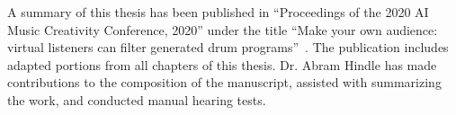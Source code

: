 \documentclass[\main/thesis.tex]{subfiles}
\begin{document}
\begin{preface}
A summary of this thesis has been published in \enquote{Proceedings of the 2020 AI Music Creativity Conference, 2020} under the title \enquote{Make your own audience: virtual listeners can filter generated drum programs}~\cite{salimiCSMC2020-virtual-listeners-drums}. The publication includes adapted portions from all chapters of this thesis.  Dr. Abram Hindle has made contributions to the composition of the manuscript, assisted with summarizing the work, and conducted manual hearing tests.\\





\end{preface}
\end{document}

